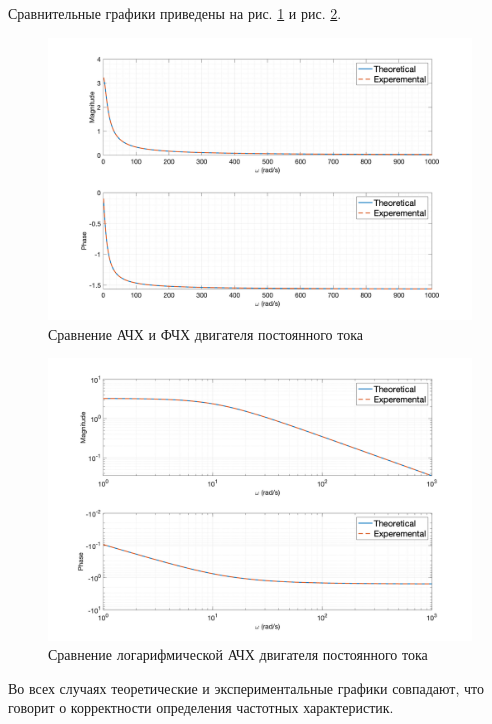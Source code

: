 Сравнительные графики приведены на рис. \ref{fig:task1_freq_resp_cmp_lin} и рис. \ref{fig:task1_freq_resp_cmp_loglog}.
\begin{figure}[ht!]
    \centering
    \includegraphics[width=\textwidth]{media/plots/task1_freq_resp_cmp_lin.png}
    \caption{Сравнение АЧХ и ФЧХ двигателя постоянного тока}
    \label{fig:task1_freq_resp_cmp_lin}
\end{figure}
\begin{figure}[ht!]
    \centering
    \includegraphics[width=\textwidth]{media/plots/task1_freq_resp_cmp_loglog.png}
    \caption{Сравнение логарифмической АЧХ двигателя постоянного тока}
    \label{fig:task1_freq_resp_cmp_loglog}
\end{figure}

Во всех случаях теоретические и экспериментальные графики совпадают, что 
говорит о корректности определения частотных характеристик. 